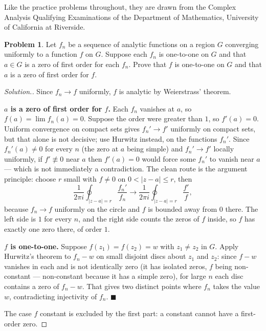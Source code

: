\documentclass[11pt,a4paper]{article}
\theoremstyle{definition}
\newtheorem{problemx}{Problem}[section]
\newenvironment{problem}{\begin{problemx}}{\end{problemx}}
\newenvironment{solution}
  {\renewcommand{\qedsymbol}{}\begin{proof}[\textit{Solution}.]}
  {\end{proof}}
\begin{document}
Like the practice problems throughout, they are drawn from the Complex Analysis
Qualifying Examinations of the Department of Mathematics, University of
California at Riverside.

\begin{problem}
Let $f_n$ be a sequence of analytic functions on a region $G$ converging
uniformly to a function $f$ on $G$. Suppose each $f_n$ is one-to-one on $G$ and
that $a \in G$ is a zero of first order for each $f_n$. Prove that $f$ is
one-to-one on $G$ and that $a$ is a zero of first order for $f$.
\end{problem}

\begin{solution}
Since $f_n \rightarrow f$ uniformly, $f$ is analytic by Weierstrass' theorem.

\textbf{$a$ is a zero of first order for $f$.} Each $f_n$ vanishes at $a$, so
$f(a) = \lim f_n(a) = 0$. Suppose the order were greater than $1$, so
$f'(a) = 0$. Uniform convergence on compact sets gives $f_n' \rightarrow f'$
uniformly on compact sets, but that alone is not decisive; use Hurwitz instead, on
the functions $f_n'$. Since $f_n'(a) \neq 0$ for every $n$ (the zero at $a$ being
simple) and $f_n' \rightarrow f'$ locally uniformly, if $f' \not\equiv 0$ near $a$
then $f'(a) = 0$ would force some $f_n'$ to vanish near $a$ --- which is not
immediately a contradiction. The clean route is the argument principle: choose
$r$ small with $f \neq 0$ on $0 < \left|z-a\right| \leq r$, then
$$\frac{1}{2\pi i}\oint_{\left|z-a\right|=r}\frac{f_n'}{f_n}
\longrightarrow \frac{1}{2\pi i}\oint_{\left|z-a\right|=r}\frac{f'}{f},$$
because $f_n \rightarrow f$ uniformly on the circle and $f$ is bounded away from
$0$ there. The left side is $1$ for every $n$, and the right side counts the zeros
of $f$ inside, so $f$ has exactly one zero there, of order $1$.

\textbf{$f$ is one-to-one.} Suppose $f(z_1) = f(z_2) = w$ with $z_1 \neq z_2$ in
$G$. Apply Hurwitz's theorem to $f_n - w$ on small disjoint discs about $z_1$ and
$z_2$: since $f - w$ vanishes in each and is not identically zero (it has isolated
zeros, $f$ being non-constant --- non-constant because it has a simple zero), for
large $n$ each disc contains a zero of $f_n - w$. That gives two distinct points
where $f_n$ takes the value $w$, contradicting injectivity of $f_n$.
$\blacksquare$

The case $f$ constant is excluded by the first part: a constant cannot have a
first-order zero.
\end{solution}
\end{document}
